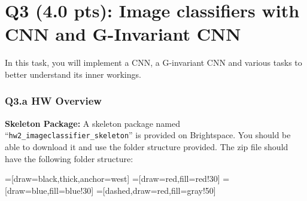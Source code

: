 \section{Q3 (4.0 pts): Image classifiers with CNN and G-Invariant CNN} 
In this task, you will implement a CNN, a G-invariant CNN and various tasks to better understand its inner workings.
%

\subsubsection*{Q3.a HW Overview}
\label{subsubsec:overview}

%
\noindent \textbf{Skeleton Package:}
%
A skeleton package named ``\texttt{hw2\_imageclassifier\_skeleton}'' is provided on Brightspace.
%
You should be able to download it and use the folder structure provided.
%
%
\noindent The zip file should have the following folder structure:

 \hfill

=[draw=black,thick,anchor=west]
=[draw=red,fill=red!30]
=[draw=blue,fill=blue!30]
=[dashed,draw=red,fill=gray!50]

\hfill

